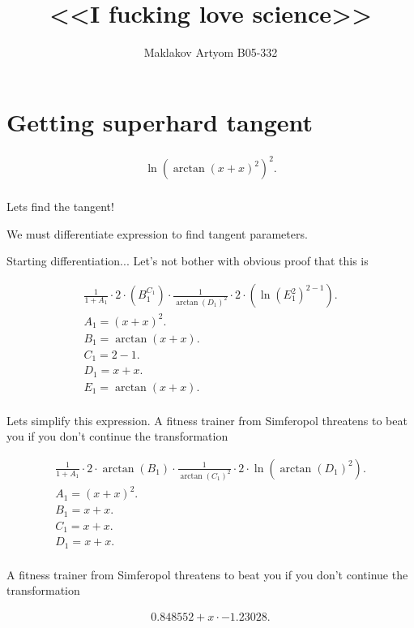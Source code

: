 \documentclass[12pt,a4paper]{extreport}
\title{<<I fucking love science>>}
\author{Maklakov Artyom B05-332}
\begin{document}
\maketitle
\tableofcontents
\section{Getting superhard tangent}


\begin{multline}
\ln(\arctan(x + x) ^ {2}) ^ {2}.\\
\end{multline}


Lets find the tangent!

We must differentiate expression to find tangent parameters.

Starting differentiation... 
Let's not bother with obvious proof that this is 

\begin{multline}
\frac{1}{1 + A_{1}} \cdot 2 \cdot (B_{1} ^ {C_{1}}) \cdot \frac{1}{\arctan(D_{1}) ^ {2}} \cdot 2 \cdot (\ln(E_{1} ^ {2}) ^ {2 - 1}).\\
A_{1} = (x + x) ^ {2}.\\
B_{1} = \arctan(x + x).\\
C_{1} = 2 - 1.\\
D_{1} = x + x.\\
E_{1} = \arctan(x + x).\\
\end{multline}


Lets simplify this expression.
A fitness trainer from Simferopol\cite{SJ} threatens to beat you if you don't continue the transformation 

\begin{multline}
\frac{1}{1 + A_{1}} \cdot 2 \cdot \arctan(B_{1}) \cdot \frac{1}{\arctan(C_{1}) ^ {2}} \cdot 2 \cdot \ln(\arctan(D_{1}) ^ {2}).\\
A_{1} = (x + x) ^ {2}.\\
B_{1} = x + x.\\
C_{1} = x + x.\\
D_{1} = x + x.\\
\end{multline}

A fitness trainer from Simferopol\cite{SJ} threatens to beat you if you don't continue the transformation 

\begin{multline}
0.848552 + x \cdot -1.23028.\\
\end{multline}
\end{document}
